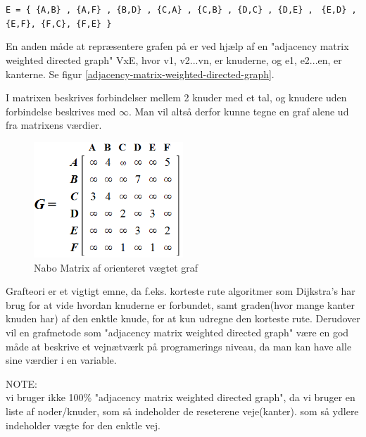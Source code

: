 \vspace{5mm}

\verb!E = { {A,B} , {A,F} , {B,D} , {C,A} , {C,B} , {D,C} , {D,E} ,!
\verb! {E,D} , {E,F}, {F,C}, {F,E} }!

\vspace{5mm}

En anden måde at repræsentere grafen på er ved hjælp af en "adjacency matrix weighted directed graph" VxE, hvor v1, v2...vn, er knuderne, og e1, e2...en, er kanterne. Se figur \ref{adjacency-matrix-weighted-directed-graph}. 

I matrixen beskrives forbindelser mellem 2 knuder med et tal, og knudere uden forbindelse beskrives med $\infty$. Man vil altså derfor kunne tegne en graf alene ud fra matrixens værdier.

\begin{figure}[H]
\begin{adjustbox}{width=0.5\textwidth,center=\textwidth}
\centering
\includegraphics[width=0.5\textwidth]{Pictures/Teoriafsnit/Figurfiler/adjacency_matrix_weighted_directed_graph.PNG}
\end{adjustbox}
\caption{Nabo Matrix af orienteret vægtet graf}
\label{fig:adjacency-matrix-weighted-directed-graph}
\end{figure}

Grafteori er et vigtigt emne, da f.eks. korteste rute algoritmer som Dijkstra's har brug for at vide hvordan knuderne er forbundet, samt graden(hvor mange kanter knuden har) af den enktle knude, for at kun udregne den korteste rute. Derudover vil en grafmetode som "adjacency matrix weighted directed graph" være en god måde at beskrive et vejnætværk på programerings niveau, da man kan have alle sine værdier i en variable.

\vspace{5mm}


NOTE: \\
vi bruger ikke 100\% "adjacency matrix weighted directed graph", da vi bruger en liste af noder/knuder, som så indeholder de reseterene veje(kanter). som så ydlere indeholder vægte for den enktle vej.



